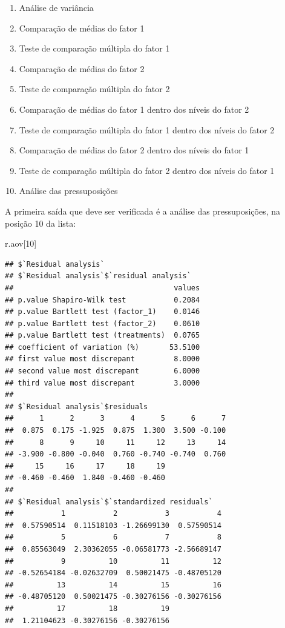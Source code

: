 \documentclass[
]{article}
\newenvironment{Shaded}{\begin{snugshade}}{\end{snugshade}}
\newcommand{\DecValTok}[1]{\textcolor[rgb]{0.00,0.00,0.81}{#1}}
\newcommand{\NormalTok}[1]{#1}
\providecommand{\tightlist}{%
  \setlength{\itemsep}{0pt}\setlength{\parskip}{0pt}}
\begin{document}
\begin{enumerate}
\def\labelenumi{\arabic{enumi}.}
\tightlist
\item
  Análise de variância
\item
  Comparação de médias do fator 1
\item
  Teste de comparação múltipla do fator 1
\item
  Comparação de médias do fator 2\\
\item
  Teste de comparação múltipla do fator 2
\item
  Comparação de médias do fator 1 dentro dos níveis do fator 2
\item
  Teste de comparação múltipla do fator 1 dentro dos níveis do fator 2
\item
  Comparação de médias do fator 2 dentro dos níveis do fator 1
\item
  Teste de comparação múltipla do fator 2 dentro dos níveis do fator 1
\item
  Análise das pressuposições
\end{enumerate}

A primeira saída que deve ser verificada é a análise das pressuposições, na posição 10 da lista:

\begin{Shaded}
\begin{Highlighting}[]
\NormalTok{r.aov[}\DecValTok{10}\NormalTok{]}
\end{Highlighting}
\end{Shaded}

\begin{verbatim}
## $`Residual analysis`
## $`Residual analysis`$`residual analysis`
##                                     values
## p.value Shapiro-Wilk test           0.2084
## p.value Bartlett test (factor_1)    0.0146
## p.value Bartlett test (factor_2)    0.0610
## p.value Bartlett test (treatments)  0.0765
## coefficient of variation (%)       53.5100
## first value most discrepant         8.0000
## second value most discrepant        6.0000
## third value most discrepant         3.0000
## 
## $`Residual analysis`$residuals
##      1      2      3      4      5      6      7 
##  0.875  0.175 -1.925  0.875  1.300  3.500 -0.100 
##      8      9     10     11     12     13     14 
## -3.900 -0.800 -0.040  0.760 -0.740 -0.740  0.760 
##     15     16     17     18     19 
## -0.460 -0.460  1.840 -0.460 -0.460 
## 
## $`Residual analysis`$`standardized residuals`
##           1           2           3           4 
##  0.57590514  0.11518103 -1.26699130  0.57590514 
##           5           6           7           8 
##  0.85563049  2.30362055 -0.06581773 -2.56689147 
##           9          10          11          12 
## -0.52654184 -0.02632709  0.50021475 -0.48705120 
##          13          14          15          16 
## -0.48705120  0.50021475 -0.30276156 -0.30276156 
##          17          18          19 
##  1.21104623 -0.30276156 -0.30276156
\end{verbatim}
\end{document}
